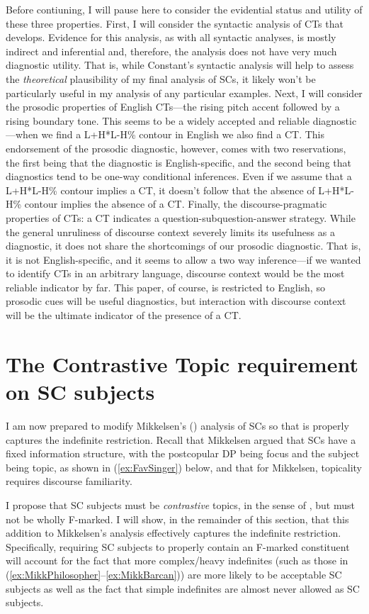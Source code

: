 \documentclass[
]{RCL}
\begin{document}
Before contiuning, I will pause here to consider the evidential status and utility of these three properties.
First, I will consider the syntactic analysis of CTs that \citet{constant2014diss} develops.
Evidence for this analysis, as with all syntactic analyses, is mostly indirect and inferential and, therefore, the analysis does not have very much diagnostic utility.
That is, while Constant's syntactic analysis will help to assess the \textit{theoretical} plausibility of my final analysis of SCs, it likely won't be particularly useful in my analysis of any particular examples.
Next, I will consider the prosodic properties of English CTs---the rising pitch accent followed by a rising boundary tone.
This seems to be a widely accepted and reliable diagnostic---when we find a L+H*L-H\% contour in English we also find a CT.
This endorsement of the prosodic diagnostic, however, comes with two reservations, the first being that the diagnostic is English-specific, and the second being that diagnostics tend to be one-way conditional inferences.
Even if we assume that a L+H*L-H\% contour implies a CT, it doesn't follow that the absence of L+H*L-H\% contour implies the absence of a CT.
Finally, the discourse-pragmatic properties of CTs: a CT indicates a question-subquestion-answer strategy.
While the general unruliness of discourse context severely limits its usefulness as a diagnostic, it does not share the shortcomings of our prosodic diagnostic.
That is, it is not English-specific, and it seems to allow a two way inference---if we wanted to identify CTs in an arbitrary language, discourse context would be the most reliable indicator by far.
This paper, of course, is restricted to English, so prosodic cues will be useful diagnostics, but interaction with discourse context will be the ultimate indicator of the presence of a CT.
\section{The Contrastive Topic requirement on SC subjects}\label{sec:MainArgument}
I am now prepared to modify Mikkelsen's (\citeyear{mikkelsen2005copular}) analysis of SCs so that is properly captures the indefinite restriction.
Recall that Mikkelsen argued that SCs have a fixed information structure, with the postcopular DP being focus and the subject being topic, as shown in (\ref{ex:FavSinger}) below, and that for Mikkelsen, topicality requires discourse familiarity.
\begin{exe}
\end{exe}
I propose that SC subjects must be \textit{contrastive} topics, in the sense of \citet{constant2014diss}, but must not be wholly F-marked.
I will show, in the remainder of this section, that this addition to Mikkelsen's analysis effectively captures the indefinite restriction.
Specifically, requiring SC subjects to properly contain an F-marked constituent will account for the fact that more complex/heavy indefinites (such as those in (\ref{ex:MikkPhilosopher}--\ref{ex:MikkBarcan})) are more likely to be acceptable SC subjects as well as the fact that simple indefinites are almost never allowed as SC subjects.
\end{document}
